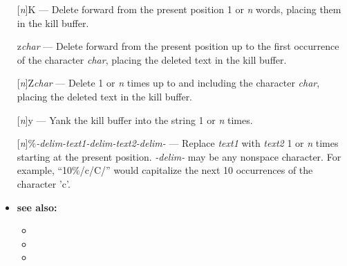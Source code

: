 \begin{itemize}
\item [] [{\em n}]K --- Delete forward from the present position 1 or {\em n} words, placing them in the kill buffer.
\item [] z{\em char} --- Delete forward from the present position up to the first occurrence of the character {\em char},
        placing the deleted text in the kill buffer.
\item [] [{\em n}]Z{\em char} --- Delete 1 or {\em n} times up to and including the
        character {\em char}, placing the deleted text in the kill buffer.
\item [] [{\em n}]y --- Yank the kill buffer into the string 1 or {\em n} times.
\item [] [{\em n}]\%{\em -delim-}{\em text1}{\em -delim-}{\em text2}{\em -delim-} ---
        Replace {\em text1} with {\em text2} 1 or {\em n} times starting at the
        present position.  {\em -delim-} may be any nonspace character.  For example,
         ``10\%/c/C/'' would capitalize the next 10 occurrences of the character 'c'.
\item {\bf see also:}
    \begin{itemize}
    \item {}
    \item {}
    \item {}
    \end{itemize}
\end{itemize}


